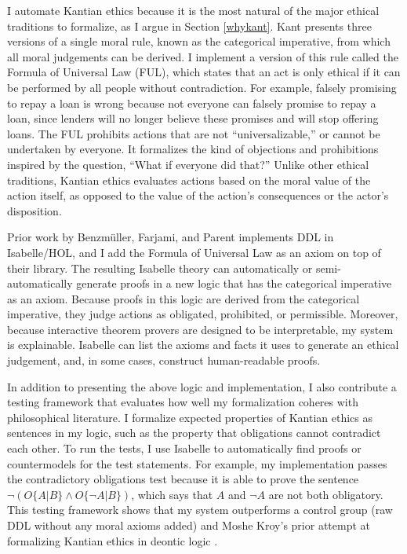 \begin{isabellebody}
\begin{isamarkuptext}
I automate Kantian ethics because it is the most natural of the major ethical traditions to formalize, as 
I argue in Section \ref{whykant}. 
Kant presents three versions of a single moral rule, known as the categorical imperative, from which 
all moral judgements can be derived. I implement a version of this rule called the Formula of Universal 
Law (FUL), which states that an act is only ethical if it can be performed by all people without contradiction. 
For example, falsely promising to repay a loan is wrong because not everyone can falsely promise to 
repay a loan, since lenders will no longer believe these promises and will stop offering loans. The FUL
prohibits actions that are not ``universalizable,'' or cannot be undertaken by everyone. It formalizes
the kind of objections and prohibitions inspired by the question, ``What if everyone did that?'' Unlike
other ethical traditions, Kantian ethics evaluates actions based on the moral value of the action itself, as opposed to
the value of the action's consequences or the actor's disposition.

Prior work by Benzmüller, Farjami, and Parent \citep{logikey, BFP} implements DDL in Isabelle/HOL, and 
I add the Formula of Universal Law as an axiom on top of their library. The resulting Isabelle theory 
can automatically or semi-automatically generate proofs in a new logic that has the categorical 
imperative as an axiom. Because proofs in this logic are derived from the categorical imperative, 
they judge actions as obligated, prohibited, or permissible. Moreover, because interactive 
theorem provers are designed to be interpretable, my system is explainable. Isabelle can list 
the axioms and facts it uses to generate an ethical judgement, and, in some cases, construct 
human-readable proofs. 

In addition to presenting the above logic and implementation, I also contribute a testing framework 
that evaluates how well my formalization coheres with philosophical literature. I formalize expected 
properties of Kantian ethics as sentences in my logic, such as the property that obligations cannot 
contradict each other. To run the tests, I use Isabelle to automatically find proofs or 
countermodels for the test statements. For example, my implementation passes the contradictory 
obligations test because it is able to prove the sentence $\neg (O\{A|B\} \wedge O\{\neg A | B\})$, 
which says that $A$ and $\neg A$ are not both obligatory. This testing framework shows that my system 
outperforms a control group (raw DDL without any moral axioms added) and 
Moshe Kroy's prior attempt at formalizing Kantian ethics in deontic logic \citep{kroy}.


\end{isamarkuptext}
\end{isabellebody}
